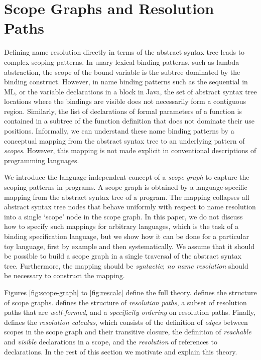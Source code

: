 \section{Scope Graphs and Resolution Paths}

\lstset{language=PCFM}

Defining name resolution directly in terms of the abstract syntax tree leads to
complex scoping patterns.
In unary lexical binding patterns, such as lambda abstraction, the scope of the
bound variable is the subtree dominated by the binding construct.
However, in name binding patterns such as the sequential  in ML,
or the variable declarations in a block in Java, the set of abstract
syntax tree locations where the bindings are visible does not necessarily 
form a contiguous region.
Similarly, the list of
declarations of formal parameters of a function is contained in a subtree of the
function definition that does not dominate their use positions.
Informally, we can understand these name binding patterns by a conceptual 
mapping from the abstract
syntax tree to an underlying pattern of \emph{scopes}.
However, this mapping is not made explicit in conventional descriptions of
programming languages.

We introduce the language-independent concept of a \emph{scope graph} to capture
the scoping patterns in programs.
A scope graph is obtained by a language-specific mapping from the abstract
syntax tree of a program.
The mapping collapses all abstract syntax tree nodes that behave uniformly with
respect to name resolution into a single `scope' node in the scope graph.
In this paper, we do not discuss how to specify such mappings for arbitrary
languages, which is the task of a binding specification language, but
we show how it can be done for a particular toy language, first by example and
then systematically. 
We assume that it should be possible to build a scope graph in a single
traversal of the abstract syntax tree.
Furthermore, the mapping should be \emph{syntactic}; \emph{no name resolution}
should be necessary to construct the mapping.  



Figures \ref{fig:scope-graph} to \ref{fig:rescalc} define the full theory.
 defines the structure of scope graphs.
 defines the structure of \emph{resolution paths}, a subset of
resolution paths that are \emph{well-formed}, and a \emph{specificity ordering} on
resolution paths.
Finally,  defines the \emph{resolution calculus}, which consists
of the definition of \emph{edges} between scopes in the scope graph and their
transitive closure, the definition of \emph{reachable} and \emph{visible}
declarations in a scope, and the \emph{resolution} of references to
declarations.
In the rest of this section we motivate and explain this theory.



